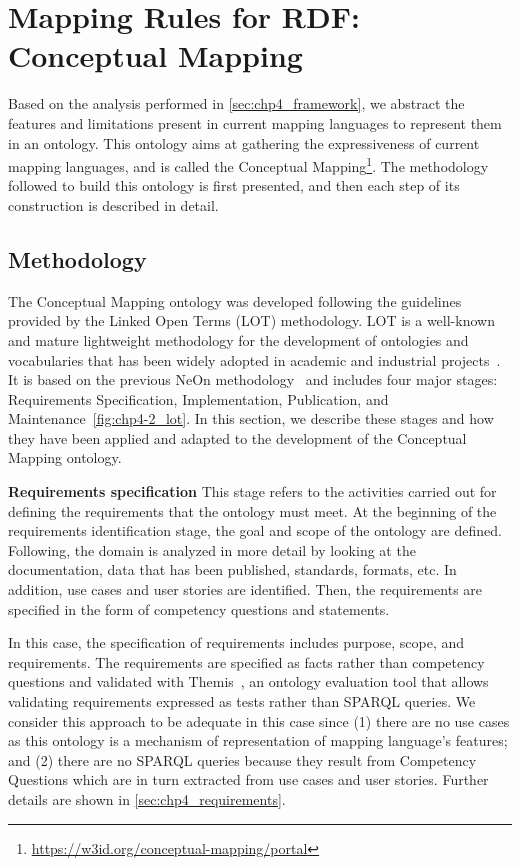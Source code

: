 \section{Mapping Rules for RDF: Conceptual Mapping}
\label{sec:chp4_cm_ontology}

Based on the analysis performed in \cref{sec:chp4_framework}, we abstract the features and limitations present in current mapping languages to represent them in an ontology. This ontology aims at gathering the expressiveness of current mapping languages, and is called the Conceptual Mapping\footnote{\label{foot:cmportal}\url{https://w3id.org/conceptual-mapping/portal}}. The methodology followed to build this ontology is first presented, and then each step of its construction is described in detail.

\subsection{Methodology}
The Conceptual Mapping ontology was developed following the guidelines provided by the Linked Open Terms (LOT) methodology. LOT is a well-known and mature lightweight methodology for the development of ontologies and vocabularies that has been widely adopted in academic and industrial projects~\cite{poveda2022lot}. It is based on the previous NeOn methodology~\cite{suarez2015neon} and includes four major stages: Requirements Specification, Implementation, Publication, and Maintenance~\cref{fig:chp4-2_lot}. In this section, we describe these stages and how they have been applied and adapted to the development of the Conceptual Mapping ontology.

\noindent\textbf{Requirements specification}
This stage refers to the activities carried out for defining the requirements that the ontology must meet. At the beginning of the requirements identification stage, the goal and scope of the ontology are defined. Following, the domain is analyzed in more detail by looking at the documentation, data that has been published, standards, formats, etc. In addition, use cases and user stories are identified. Then, the requirements are specified in the form of competency questions and statements. 

In this case, the specification of requirements includes purpose, scope, and requirements. The requirements are specified as facts rather than competency questions and validated with Themis~\cite{fernandez2021themis}, an ontology evaluation tool that allows validating requirements expressed as tests rather than SPARQL queries. We consider this approach to be adequate in this case since (1) there are no use cases as this ontology is a mechanism of representation of  mapping language's features; and (2) there are no SPARQL queries because they result from Competency Questions which are in turn extracted from use cases and user stories. Further details are shown in \cref{sec:chp4_requirements}.

